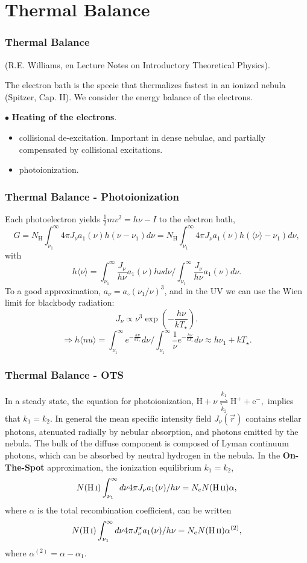 \section{Thermal Balance}
\begin{frame}\frametitle{Thermal Balance}

(R.E. Williams, en Lecture Notes on Introductory Theoretical
Physics). 

The electron bath is the specie that thermalizes fastest in an ionized
nebula (Spitzer, Cap. II). We consider the energy balance of the electrons.

$\bullet$ {\bf \large Heating of the  electrons}.
\begin{itemize}
\item collisional de-excitation. Important in dense nebulae, and
partially compensated by collisional excitations.
\item photoionization. 
\end{itemize}

\end{frame}
\begin{frame}\frametitle{Thermal Balance
- Photoionization}

Each photoelectron yields $\frac{1}{2} m v^2 = h \nu - I $ to the
electron bath, 
\[ 
G = N_\mathrm{H} \int_{\nu_1}^{\infty} 4 \pi J_\nu a_1(\nu) h (\nu -
\nu_1) d\nu  = N_\mathrm{H} \int_{\nu_1}^{\infty} 4 \pi J_\nu a_1(\nu) h (\langle
\nu \rangle  - \nu_1) d\nu,
\]
with
\[
h\langle \nu \rangle = \int_{\nu_1}^{\infty} \frac{J_\nu}{h\nu}
a_1(\nu) h \nu d\nu  / \int_{\nu_1}^{\infty} \frac{J_\nu}{h\nu} a_1(\nu)  d\nu.
\]
To a good approximation,   $a_\nu = a_\circ (\nu_1/\nu)^3$, and in the
UV we can use the Wien limit for blackbody radiation:
\[
J_\nu  \propto \nu^3 \exp \left( - \frac{h \nu} {k T_\star} \right). 
\]
\[\Rightarrow h \langle nu \rangle = \int_{\nu_1}^{\infty}
e^{-\frac{h\nu}{kT_\star}} d\nu / \int_{\nu_1}^{\infty} \frac{1}{\nu}
e^{-\frac{h\nu}{kT_\star}} d\nu \approx h\nu_1 + k T_\star. \]

\end{frame}
\begin{frame}\frametitle{Thermal Balance - OTS}

In a steady state, the equation for photoionization, $\mathrm{H} + \nu \overset{k_1}{\underset{k_2}{\rightleftharpoons}} \mathrm{H}^+ + \mathrm{e}^- ,$ 
implies that 
$k_1 = k_2 $. In general the mean specific intensity field $J_\nu(\vec{r})$ contains stellar
photons, atenuated radially by nebular absorption, and photons emitted
by the nebula. The bulk of the diffuse component is composed of Lyman
continuum photons, which can be absorbed by neutral hydrogen in the
nebula.  In the {\bf On-The-Spot} approximation, the ionization
equilibrium $k_1 = k_2$,
\[
N(\text{H\,{\sc i}})  \int_{\nu_1}^{\infty} d\nu  4 \pi J_\nu a_1(\nu)  / h
\nu = N_e N(\text{H\,{\sc ii}}) \alpha, 
\]
where  $\alpha$ is the total recombination coefficient, can be written
\[
N(\text{H\,{\sc i}})  \int_{\nu_1}^{\infty} d\nu  4 \pi J^\star_\nu a_1(\nu)  / h
\nu = N_e N(\text{H\,{\sc ii}}) \alpha^{(2)}, 
\]
where $\alpha^{(2)} = \alpha - \alpha_1$.

\end{frame}
